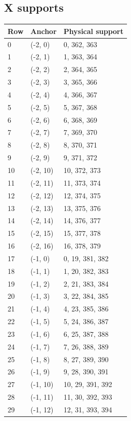 \documentclass{article}
\begin{document}
\subsection{X supports}\label{app:x-supports}

\begin{longtable}{lll}
  Row & Anchor & Physical support \\
  \hline
  \endhead
  0 & (-2, 0) & 0, 362, 363 \\
  1 & (-2, 1) & 1, 363, 364 \\
  2 & (-2, 2) & 2, 364, 365 \\
  3 & (-2, 3) & 3, 365, 366 \\
  4 & (-2, 4) & 4, 366, 367 \\
  5 & (-2, 5) & 5, 367, 368 \\
  6 & (-2, 6) & 6, 368, 369 \\
  7 & (-2, 7) & 7, 369, 370 \\
  8 & (-2, 8) & 8, 370, 371 \\
  9 & (-2, 9) & 9, 371, 372 \\
  10 & (-2, 10) & 10, 372, 373 \\
  11 & (-2, 11) & 11, 373, 374 \\
  12 & (-2, 12) & 12, 374, 375 \\
  13 & (-2, 13) & 13, 375, 376 \\
  14 & (-2, 14) & 14, 376, 377 \\
  15 & (-2, 15) & 15, 377, 378 \\
  16 & (-2, 16) & 16, 378, 379 \\
  17 & (-1, 0) & 0, 19, 381, 382 \\
  18 & (-1, 1) & 1, 20, 382, 383 \\
  19 & (-1, 2) & 2, 21, 383, 384 \\
  20 & (-1, 3) & 3, 22, 384, 385 \\
  21 & (-1, 4) & 4, 23, 385, 386 \\
  22 & (-1, 5) & 5, 24, 386, 387 \\
  23 & (-1, 6) & 6, 25, 387, 388 \\
  24 & (-1, 7) & 7, 26, 388, 389 \\
  25 & (-1, 8) & 8, 27, 389, 390 \\
  26 & (-1, 9) & 9, 28, 390, 391 \\
  27 & (-1, 10) & 10, 29, 391, 392 \\
  28 & (-1, 11) & 11, 30, 392, 393 \\
  29 & (-1, 12) & 12, 31, 393, 394 \\

\end{longtable}
\end{document}

